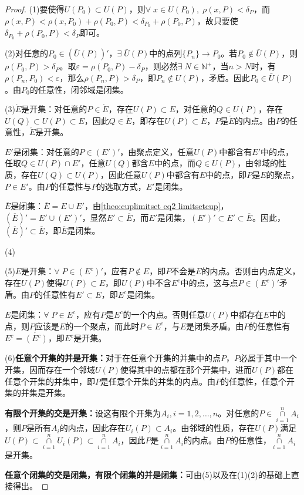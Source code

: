 \begin{proof}
	(1)要使得$U(P_0)\subset U(P)$，则$\forall\;x\in U(P_0),\;\rho(x,P)<\delta_P$，而$\rho(x,P)<\rho(x,P_0)+\rho(P_0,P)<\delta_{P_0}+\rho(P_0,P)$，故只要使$\delta_{P_0}+\rho(P_0,P)<\delta_P$即可。 \par
	(2)对任意的$P_0\in\left(\bar{U}(P)\right)'$，$\exists\;\bar{U}(P)$中的点列$\{P_n\}\to P_0$。若$P_0\notin \bar{U}(P)$，则$\rho(P_0,P)>\delta_P$。取$\varepsilon=\rho(P_0,P)-\delta_P$，则必然$\exists\;N\in\mathbb{N}^+$，当$n>N$时，有$\rho(P_n,P_0)<\varepsilon$，那么$\rho(P_n,P)>\delta_P$，即$P_n\notin U(P)$，矛盾。因此$P_0\in \bar{U}(P)$。由$P_0$的任意性，闭邻域是闭集。\par
	(3)$\mathring{E}$是开集：对任意的$ P\in\mathring{E}$，存在$U(P)\subset E$，对任意的$ Q\in U(P)$，存在$U(Q)\subset U(P)\subset E$，因此$Q\in\mathring{E}$，即存在$U(P)\subset\mathring{E}$，$P$是$\mathring{E}$的内点。由$P$的任意性，$\mathring{E}$是开集。\par
	$E'$是闭集：对任意的$ P\in (E')'$，由聚点定义，任意$U(P)$中都含有$E'$中的点，任取$Q\in U(P)\cap E'$，任意$U(Q)$都含$E$中的点，而$Q\in U(P)$，由邻域的性质，存在$U(Q)\subset U(P)$，因此任意$U(P)$中都含有$E$中的点，即$P$是$E$的聚点，$P\in E'$。由$P$的任意性与$P$的选取方式，$E'$是闭集。\par
	$\overline{E}$是闭集：$\overline{E}=E\cup E'$，由\cref{theo:cuplimitset eq2 limitsetcup}，$(\overline{E})'=E'\cup (E')'$，显然$E'\subset \overline{E}$，而$E'$是闭集，$(E')'\subset E'\subset\overline{E}$。因此，$(\overline{E})'\subset\overline{E}$，即$\overline{E}$是闭集。\par
	(4)\par
	(5)$E$是开集：$\forall\; P\in (E^c)'$，应有$P\notin E$，即$P$不会是$E$的内点。否则由内点定义，存在$U(P)$使得$U(P)\subset E$，即$U(P)$中不含$E^c$中的点，这与点$P\in (E^c)'$矛盾。由$P$的任意性有$E'\subset E$，即$E^c$是闭集。\par
	$E$是闭集：$\forall\; P\in E^c$，应有$P$是$E^c$的一个内点。否则任意$U(P)$中都存在$E$中的点，则$P$应该是$E$的一个聚点，而此时$P\in E^c$，与$E$是闭集矛盾。由$P$的任意性有$E^c=\mathring{(E^c)}$，即$E^c$是开集。\par
	(6)\textbf{任意个开集的并是开集：}对于在任意个开集的并集中的点$P$，$P$必属于其中一个开集，因而存在一个邻域$U(P)$使得其中的点都在那个开集中，进而$U(P)$都在任意个开集的并集中，即$P$是任意个开集的并集的内点。由$P$的任意性，任意个开集的并集是开集。\par
	\textbf{有限个开集的交是开集：}设这有限个开集为$A_i,i=1,2,\dots,n$。对任意的$ P\in\underset{i=1}{\overset{n}{\cap}}A_i$，则$P$是所有$A_i$的内点，因此存在$U_i(P)\subset A_i$。由邻域的性质，存在$U(P)$满足$U(P)\subset\underset{i=1}{\overset{n}{\cap}}U_i(P)\subset\underset{i=1}{\overset{n}{\cap}}A_i$，因此$P$是$\underset{i=1}{\overset{n}{\cap}}A_i$的内点。由$P$的任意性，$\underset{i=1}{\overset{n}{\cap}}A_i$是开集。\par
	\textbf{任意个闭集的交是闭集，有限个闭集的并是闭集：}可由(5)以及在(1)(2)的基础上直接得出。
\end{proof}
